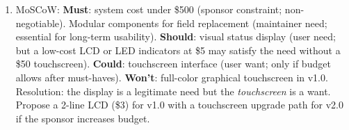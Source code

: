 \begin{enumerate}[leftmargin=1.5em]
\item MoSCoW: \textbf{Must}: system cost under \$500 (sponsor constraint; non-negotiable). Modular components for field replacement (maintainer need; essential for long-term usability). \textbf{Should}: visual status display (user need; but a low-cost LCD or LED indicators at \$5 may satisfy the need without a \$50 touchscreen). \textbf{Could}: touchscreen interface (user want; only if budget allows after must-haves). \textbf{Won't}: full-color graphical touchscreen in v1.0. Resolution: the display is a legitimate need but the \emph{touchscreen} is a want. Propose a 2-line LCD (\$3) for v1.0 with a touchscreen upgrade path for v2.0 if the sponsor increases budget.
\end{enumerate}

